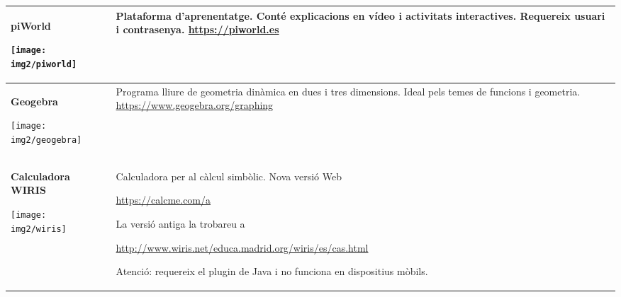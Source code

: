 \begin{center}
	\renewcommand{\arraystretch}{1.5}
\begin{longtable}[h]{>{\raggedleft\arraybackslash}p{}|p{}}
	\hline
	\textbf{piWorld}
	
	\texttt{[image: img2/piworld]}
	 & Plataforma d'aprenentatge. Conté explicacions en vídeo i activitats interactives. Requereix usuari i contrasenya. \newline
	\href{https://piworld.es}{\href{https://piworld.es}{https://piworld.es}}
	\\ \hline
 	\textbf{Geogebra} 
 	
 	\texttt{[image: img2/geogebra]}
 	& Programa lliure de geometria dinàmica en dues i tres dimensions.
 	Ideal pels temes de funcions i geometria.\newline
 	\href{https://www.geogebra.org/download}{\href{https://www.geogebra.org/graphing}{https://www.geogebra.org/graphing}}
 	  \\ \hline
 	  	\textbf{Calculadora WIRIS}
 	 
 	  	
 	  	\texttt{[image: img2/wiris]}
 	  	& Calculadora per al càlcul simbòlic. Nova versió Web \par \href{https://calcme.com/a}{https://calcme.com/a}
 	  	
 	  	La versió antiga la trobareu a \par \href{http://www.wiris.net/educa.madrid.org/wiris/es/cas.html}{http://www.wiris.net/educa.madrid.org/wiris/es/cas.html}
 	  	
 	  	 Atenció: requereix el plugin de Java i no funciona en dispositius mòbils.
 	  \\ \hline
 
 \end{longtable}
\end{center}
 